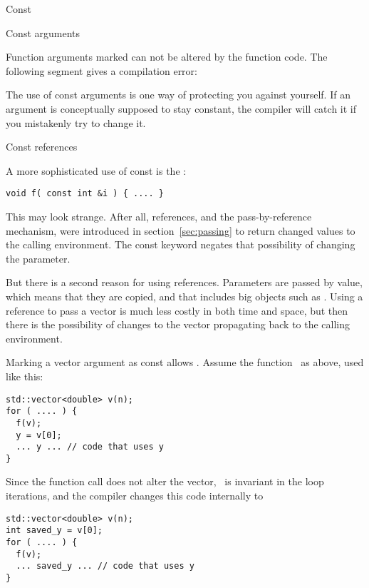 
 {Const}

 {Const arguments}
\label{sec:constparam}

Function arguments marked  can not be altered by
the function code. The following segment gives a compilation error:
%

The use of const arguments is one way of protecting you against yourself.
If an argument is conceptually supposed to stay constant, the compiler
will catch it if you mistakenly try to change it.

 {Const references}

A more sophisticated use of const is the
:
\begin{verbatim}
void f( const int &i ) { .... }
\end{verbatim}
This may look strange. After all, references, and the
pass-by-reference mechanism, were introduced in
section~\ref{sec:passing} to return changed values to the calling
environment. The const keyword negates that possibility of changing
the parameter.

But there is a second reason for using references. Parameters are
passed by value, which means that they are copied, and that includes
big objects such as . Using a reference to pass a
vector is much less costly in both time and space, but then there is the
possibility of changes to the vector propagating back to the calling
environment.

Marking a vector argument as const allows
. Assume the function~ as
above, used like this:
\begin{verbatim}
std::vector<double> v(n);
for ( .... ) {
  f(v);
  y = v[0];
  ... y ... // code that uses y
}
\end{verbatim}
Since the function call does not alter the vector, ~is invariant
in the loop iterations, and the compiler changes this code internally to
\begin{verbatim}
std::vector<double> v(n);
int saved_y = v[0];
for ( .... ) {
  f(v);
  ... saved_y ... // code that uses y
}
\end{verbatim}

